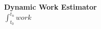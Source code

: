 \documentclass{article}
\begin{document}
\begin{center}
\textbf{ Dynamic Work Estimator }\\
$\int_{t_0}^{t_n}work $ 
\end{center}
\end{document}
